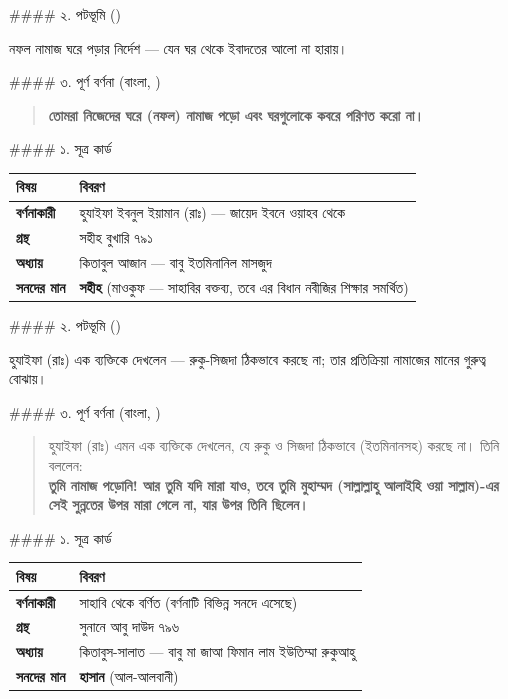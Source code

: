 \#\#\#\# ২. পটভূমি ()

নফল নামাজ ঘরে পড়ার নির্দেশ — যেন ঘর থেকে ইবাদতের আলো না হারায়।

\#\#\#\# ৩. পূর্ণ বর্ণনা (বাংলা, )

\begin{quote}
\textbf{তোমরা নিজেদের ঘরে (নফল) নামাজ পড়ো এবং ঘরগুলোকে কবরে পরিণত করো না।}
\end{quote}

\#\#\#\# ১. সূত্র কার্ড

\begin{table}[h]\centering\small
\begin{tabular}{ll}
বিষয় & বিবরণ \\
\hline
\textbf{বর্ণনাকারী} & হুযাইফা ইবনুল ইয়ামান (রাঃ) — জায়েদ ইবনে ওয়াহব থেকে \\
\textbf{গ্রন্থ} & সহীহ বুখারি ৭৯১ \\
\textbf{অধ্যায়} & কিতাবুল আজান — বাবু ইতমিনানিল মাসজুদ \\
\textbf{সনদের মান} & \textbf{সহীহ} (মাওকুফ — সাহাবির বক্তব্য, তবে এর বিধান নবীজির শিক্ষার সমর্থিত) \\
\hline
\end{tabular}
\end{table}

\#\#\#\# ২. পটভূমি ()

হুযাইফা (রাঃ) এক ব্যক্তিকে দেখলেন — রুকু-সিজদা ঠিকভাবে করছে না; তার প্রতিক্রিয়া নামাজের মানের গুরুত্ব বোঝায়।

\#\#\#\# ৩. পূর্ণ বর্ণনা (বাংলা, )

\begin{quote}
হুযাইফা (রাঃ) এমন এক ব্যক্তিকে দেখলেন, যে রুকু ও সিজদা ঠিকভাবে (ইতমিনানসহ) করছে না। তিনি বললেন: \\
\textbf{তুমি নামাজ পড়োনি! আর তুমি যদি মারা যাও, তবে তুমি মুহাম্মদ (সাল্লাল্লাহু আলাইহি ওয়া সাল্লাম)-এর সেই সুন্নতের উপর মারা গেলে না, যার উপর তিনি ছিলেন।}
\end{quote}

\#\#\#\# ১. সূত্র কার্ড

\begin{table}[h]\centering\small
\begin{tabular}{ll}
বিষয় & বিবরণ \\
\hline
\textbf{বর্ণনাকারী} & সাহাবি থেকে বর্ণিত (বর্ণনাটি বিভিন্ন সনদে এসেছে) \\
\textbf{গ্রন্থ} & সুনানে আবু দাউদ ৭৯৬ \\
\textbf{অধ্যায়} & কিতাবুস-সালাত — বাবু মা জাআ ফিমান লাম ইউতিম্মা রুকুআহু \\
\textbf{সনদের মান} & \textbf{হাসান} (আল-আলবানী) \\
\hline
\end{tabular}
\end{table}

